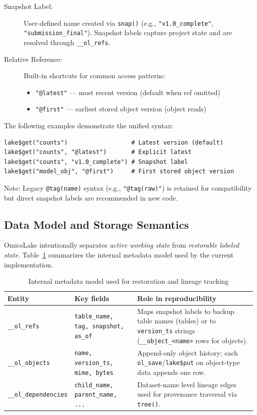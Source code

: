 \documentclass[11pt,a4paper]{article}
\begin{document}
\begin{description}
    \item[Snapshot Label:] User-defined name created via \texttt{snap()} (e.g., \texttt{"v1.0\_complete"}, \texttt{"submission\_final"}). Snapshot labels capture project state and are resolved through \texttt{\_\_ol\_refs}.
    \item[Relative Reference:] Built-in shortcuts for common access patterns:
    \begin{itemize}
        \item \texttt{"@latest"} --- most recent version (default when ref omitted)
        \item \texttt{"@first"} --- earliest stored object version (object reads)
    \end{itemize}
\end{description}

The following examples demonstrate the unified syntax:

\begin{lstlisting}[caption={Version reference syntax examples}]
lake$get("counts")                  # Latest version (default)
lake$get("counts", "@latest")       # Explicit latest
lake$get("counts", "v1.0_complete") # Snapshot label
lake$get("model_obj", "@first")     # First stored object version
\end{lstlisting}

Note: Legacy \texttt{@tag(name)} syntax (e.g., \texttt{"@tag(raw)"}) is retained for compatibility but direct snapshot labels are recommended in new code.

\subsection{Data Model and Storage Semantics}

OmicsLake intentionally separates \emph{active working state} from \emph{restorable labeled state}. Table~\ref{tab:data_model} summarizes the internal metadata model used by the current implementation.

\begin{table}[H]
\centering
\caption{Internal metadata model used for restoration and lineage tracking}
\label{tab:data_model}
\begin{tabular}{p{2.8cm}p{5.2cm}p{6.4cm}}
\toprule
\textbf{Entity} & \textbf{Key fields} & \textbf{Role in reproducibility} \\
\midrule
\texttt{\_\_ol\_refs} & \texttt{table\_name, tag, snapshot, as\_of} & Maps snapshot labels to backup table names (tables) or to \texttt{version\_ts} strings (\texttt{\_\_object\_<name>} rows for objects). \\
\texttt{\_\_ol\_objects} & \texttt{name, version\_ts, mime, bytes} & Append-only object history; each \texttt{ol\_save}/\texttt{lake\$put} on object-type data appends one row. \\
\texttt{\_\_ol\_dependencies} & \texttt{child\_name, parent\_name, ...} & Dataset-name level lineage edges used for provenance traversal via \texttt{tree()}. \\
\bottomrule
\end{tabular}
\end{table}
\end{document}
